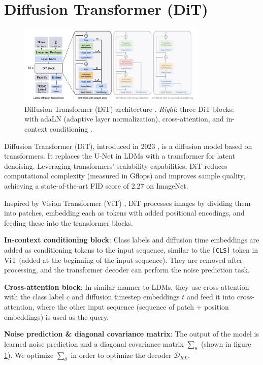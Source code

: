 \section{Diffusion Transformer (DiT)}
\label{appendix:diffusion_transformer}

\begin{figure}
    \centering
    \includegraphics[width=0.8\textwidth]{images/appendix/diffusion_transformer/architecture.png}
    \caption{Diffusion Transformer (DiT) architecture \cite{diffusion_transformer}. \textit{Right}: three DiT blocks: with adaLN (adaptive layer normalization), cross-attention, and in-context conditioning \cite{diffusion_transformer}.}
    \label{fig:diffusion_transformer_architecture}
\end{figure}


Diffusion Transformer (DiT), introduced in 2023 \cite{diffusion_transformer}, is a diffusion model based on transformers. It replaces the U-Net in LDMs with a transformer for latent denoising. Leveraging transformers' scalability capabilities, DiT reduces computational complexity (measured in Gflops) and improves sample quality, achieving a state-of-the-art FID score of 2.27 on ImageNet.

Inspired by Vision Transformer (ViT) \cite{vision_transformer}, DiT processes images by dividing them into patches, embedding each as tokens with added positional encodings, and feeding these into the transformer blocks.

\textbf{In-context conditioning block}: Class labels and diffusion time embeddings are added as conditioning tokens to the input sequence, similar to the \texttt{[CLS]} token in ViT (added at the beginning of the input sequence). They are removed after processing, and the transformer decoder can perform the noise prediction task.

\textbf{Cross-attention block}: In similar manner to LDMs, they use cross-attention with the class label $c$ and diffusion timestep embeddings $t$ and feed it into cross-attention, where the other input sequence (sequence of patch + position embeddings) is used as the query.

\textbf{Noise prediction \& diagonal covariance matrix}: The output of the model is learned noise prediction and a diagonal covariance matrix $\sum_\theta$ (shown in figure \ref{fig:diffusion_transformer_architecture}). We optimize $\sum_\theta$ in order to optimize the decoder $\mathcal{D}_{KL}$.


